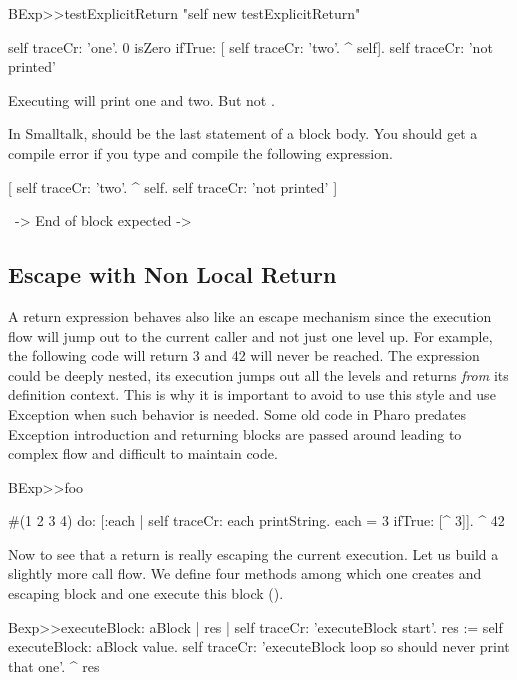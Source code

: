 \documentclass[a4paper,10pt,twoside]{book}
\begin{document}
\begin{code}{}
BExp>>testExplicitReturn
	"self new testExplicitReturn"
	
	self traceCr: 'one'.
	0 isZero ifTrue: [ self traceCr: 'two'. ^ self].
	self traceCr: 'not printed'
\end{code}

Executing  will print one and two. But not .

In Smalltalk, \ct{^} should be the last statement of a block body. You should get a compile error if you type and compile the following expression. 

\begin{code}{}
[ self traceCr: 'two'.
  ^ self.  
  self traceCr: 'not printed' ]
  
    ~-> End of block expected ->
\end{code}


\subsection{Escape with Non Local Return}
A return expression behaves also like an escape mechanism since the execution flow will jump out to the current caller and not just one level up. For example, the following code will return 3 and 42 will never be reached. The expression \ct{[ ^3 ]} could be deeply nested, its execution jumps out all the levels and returns \emph{from} its definition context. This is why it is important to avoid to use this style and use Exception when such behavior is needed. Some old code in Pharo predates Exception introduction and returning blocks are passed around leading to complex flow and difficult to maintain code. 

\begin{code}{}
BExp>>foo
	
	#(1 2 3 4) do: [:each | 
					self traceCr: each printString. 
					each = 3 
						ifTrue: [^ 3]].						
	^ 42
\end{code}

Now to see that a return is really escaping the current execution. Let us build a slightly more call flow. 
We define four methods among which one creates and escaping block  and one execute this block ().


\begin{code}{}
Bexp>>executeBlock: aBlock
	| res |
	self traceCr: 'executeBlock start'.
	res := self executeBlock: aBlock value. 
	self traceCr: 'executeBlock loop so should never print that one'.
	^  res
\end{code}
\end{document}
